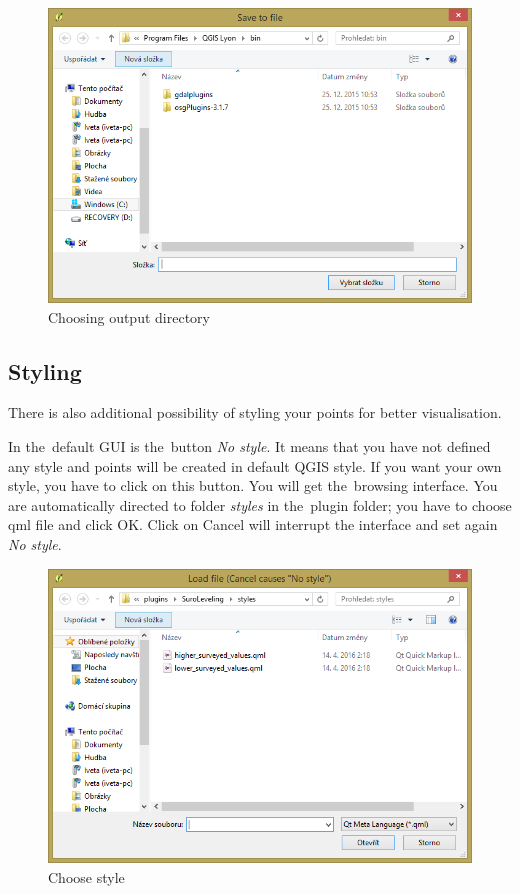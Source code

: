   \begin{figure}[H]
   \centering
	\includegraphics[scale=0.75]{./pictures/output.png}
	\caption[Choosing output directory]{Choosing output directory}
      \label{fig:output}
  \end{figure}

\subsection{Styling}
\label{styling}

There is also additional possibility of styling your points for better visualisation. 

In the~default GUI is the~button \textit{No style}. It means that you have not defined any style
and points will be created in default QGIS style. If you want your own style, you have to click on
this button. You will get the~browsing interface. You are automatically directed to folder
\textit{styles} in the~plugin folder; you have to choose qml file and click OK. Click on Cancel will
interrupt the interface and set again \textit{No style}. 

  \begin{figure}[H]
   \centering
	\includegraphics[scale=0.75]{./pictures/style.png}
	\caption[Choose style]{Choose style}
      \label{fig:style}
  \end{figure}

